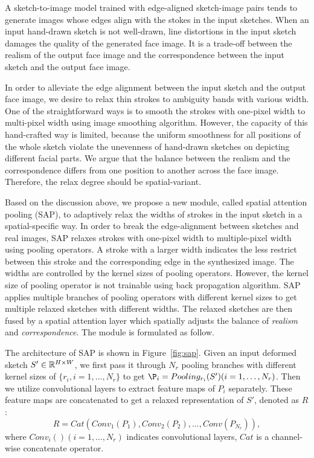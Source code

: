 

A sketch-to-image model trained with edge-aligned sketch-image pairs tends to generate images whose edges align with the stokes in the input sketches.
When an input hand-drawn sketch is not well-drawn, line distortions in the input sketch damages the quality of the generated face image. It is a trade-off between the realism of the output face image and the correspondence between the input sketch and the output face image.

In order to alleviate the edge alignment between the input sketch and the output face image, we desire to relax thin strokes to ambiguity bands with various width.
One of the straightforward ways is to smooth the strokes with one-pixel width to multi-pixel width using image smoothing algorithm. 
%
However, the capacity of this hand-crafted way is limited, because the uniform smoothness for all positions of the whole sketch violate the unevenness of hand-drawn sketches on depicting different facial parts. 
%
We argue that the balance between the realism and the correspondence differs from one position to another across the face image. Therefore, the relax degree should be spatial-variant. 

Based on the discussion above, we propose a new module, called spatial attention pooling (SAP), to adaptively relax the widths of strokes in the input sketch in a spatial-specific way. In order to break the edge-alignment between sketches and real images, SAP relaxes strokes with one-pixel width to multiple-pixel width using pooling operators. A stroke with a larger width indicates the less restrict between this stroke and the corresponding edge in the synthesized image. The widths are controlled by the kernel sizes of pooling operators. However, the kernel size of pooling operator is not trainable using back propagation algorithm. SAP applies multiple branches of pooling operators with different kernel sizes to get multiple relaxed sketches with different widths. The relaxed sketches are then fused by a spatial attention layer which spatially adjusts the balance of \textit{realism} and \textit{correspondence}. The module is formulated as follow.

The architecture of SAP is shown in Figure~\ref{fig:sap}.
Given an input deformed sketch $S'\in {\mathbb{R}}^{H\times W}$, we first pass it through $N_r$ pooling branches with different kernel sizes of $\{r_i, i=1,\ldots, N_r\}$ to get $\P_{i}=Pooling_{r_i}(S') (i=1,\ldots,N_r)$. 
Then we utilize convolutional layers to extract feature maps of $P_i$ separately. These feature maps are concatenated to get a relaxed representation of $S'$, denoted as $R$:
%
\begin{equation}
R=Cat(Conv_1(P_1), Conv_2(P_2),..., Conv(P_{N_r})),
\end{equation}
where $Conv_i() (i=1,\ldots,N_r)$ indicates convolutional layers, $Cat$ is a channel-wise concatenate operator.

